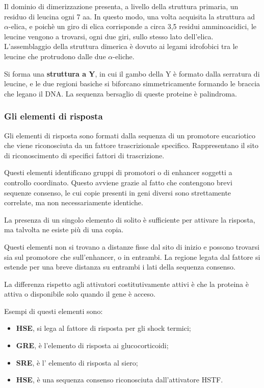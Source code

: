 \documentclass[]{article}
\begin{document}
Il dominio di dimerizzazione presenta, a livello della struttura
primaria, un residuo di leucina ogni 7 aa. In questo modo, una volta
acquisita la struttura ad \(\alpha\)-elica, e poichè un giro di elica
corrisponde a circa 3,5 residui amminoacidici, le leucine vengono a
trovarsi, ogni due giri, sullo stesso lato dell'elica. L'assemblaggio
della struttura dimerica è dovuto ai legami idrofobici tra le leucine
che protrudono dalle due \(\alpha\)-eliche.

Si forma una \textbf{struttura a Y}, in cui il gambo della Y è formato
dalla serratura di leucine, e le due regioni basiche si biforcano
simmetricamente formando le braccia che legano il DNA. La sequenza
bersaglio di queste proteine è palindroma.

\subsubsection{Gli elementi di risposta}\label{gli-elementi-di-risposta}

Gli elementi di risposta sono formati dalla sequenza di un promotore
eucariotico che viene riconosciuta da un fattore trascrizionale
specifico. Rappresentano il sito di riconoscimento di specifici fattori
di trascrizione.

Questi elementi identificano gruppi di promotori o di enhancer soggetti
a controllo coordinato. Questo avviene grazie al fatto che contengono
brevi sequenze consenso, le cui copie presenti in geni diversi sono
strettamente correlate, ma non necessariamente identiche.

La presenza di un singolo elemento di solito è sufficiente per attivare
la risposta, ma talvolta ne esiste più di una copia.

Questi elementi non si trovano a distanze fisse dal sito di inizio e
possono trovarsi sia sul promotore che sull'enhancer, o in entrambi. La
regione legata dal fattore si estende per una breve distanza su entrambi
i lati della sequenza consenso.

La differenza rispetto agli attivatori costitutivamente attivi è che la
proteina è attiva o disponibile solo quando il gene è acceso.

Esempi di questi elementi sono:

\begin{itemize}
\itemsep1pt\parskip0pt
\item
  \textbf{HSE}, si lega al fattore di risposta per gli shock termici;
\item
  \textbf{GRE}, è l'elemento di risposta ai glucocorticoidi;
\item
  \textbf{SRE}, è l' elemento di risposta al siero;
\item
  \textbf{HSE}, è una sequenza consenso riconosciuta dall'attivatore
  HSTF.
\end{itemize}
\end{document}
